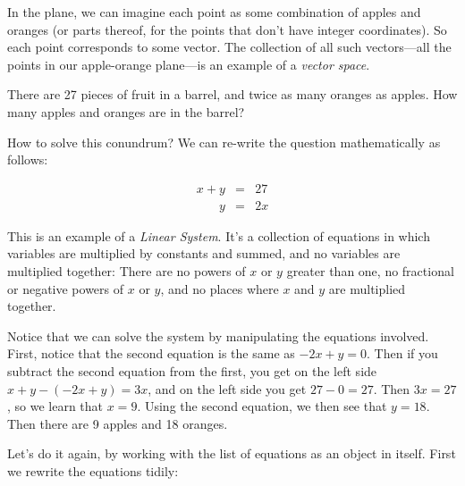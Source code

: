 \vspace{2mm}
\begin{center}
\end{center}
In the plane, we can imagine each point as some combination of apples and oranges (or parts thereof, for the points that don't have integer coordinates).  So each point corresponds to some vector.  The collection of all such vectors---all the points in our apple-orange plane---is an example of a \emph{vector space}.

\begin{example}  There are 27 pieces of fruit in a barrel, and twice as many oranges as apples.  How many apples and oranges are in the barrel?

How to solve this conundrum?  We can re-write the question mathematically as follows:

\begin{eqnarray*}
	x+y & = & 27 \\
	\phantom{x+}y & = & 2x
\end{eqnarray*}
\end{example}

This is an example of a \emph{Linear System}.  It's a collection of equations in which variables are multiplied by constants and summed, and no variables are multiplied together:  There are no powers of $x$ or $y$ greater than one, no fractional or negative powers of $x$ or $y$, and no places where $x$ and $y$ are multiplied together.

Notice that we can solve the system by manipulating the equations involved.  First, notice that the second equation is the same as $-2x+y=0$.  Then if you subtract the second equation from the first, you get on the left side $x+y - (-2x+y) = 3x$, and on the left side you get $27-0=27$.  Then $3x=27$, so we learn that $x=9$.  Using the second equation, we then see that $y=18$.  Then there are 9 apples and 18 oranges.

Let's do it again, by working with the list of equations as an object in itself.  First we rewrite the equations tidily:


